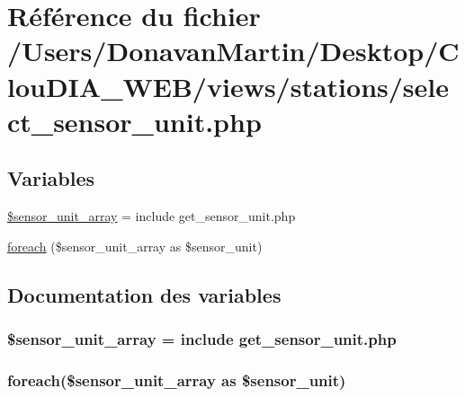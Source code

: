 \hypertarget{select__sensor__unit_8php}{}\section{Référence du fichier /\+Users/\+Donavan\+Martin/\+Desktop/\+Clou\+D\+I\+A\+\_\+\+W\+E\+B/views/stations/select\+\_\+sensor\+\_\+unit.php}
\label{select__sensor__unit_8php}
\subsection*{Variables}
\begin{DoxyCompactItemize}
\item 
\hyperlink{select__sensor__unit_8php_a8f41b989e454e33cf88090a128501a84}{\$sensor\+\_\+unit\+\_\+array} = include \textquotesingle{}get\+\_\+sensor\+\_\+unit.\+php\textquotesingle{}
\item 
\hyperlink{select__sensor__unit_8php_a1c1975000357477a6517a3e7dad478b0}{foreach} (\$sensor\+\_\+unit\+\_\+array as \$sensor\+\_\+unit)
\end{DoxyCompactItemize}


\subsection{Documentation des variables}
\hypertarget{select__sensor__unit_8php_a8f41b989e454e33cf88090a128501a84}{}
\subsubsection[{\$sensor\+\_\+unit\+\_\+array}]{\setlength{\rightskip}{0pt plus 5cm}\$sensor\+\_\+unit\+\_\+array = include \textquotesingle{}get\+\_\+sensor\+\_\+unit.\+php\textquotesingle{}}\label{select__sensor__unit_8php_a8f41b989e454e33cf88090a128501a84}
\hypertarget{select__sensor__unit_8php_a1c1975000357477a6517a3e7dad478b0}{}
\subsubsection[{foreach}]{\setlength{\rightskip}{0pt plus 5cm}foreach(\$sensor\+\_\+unit\+\_\+array as \$sensor\+\_\+unit)}\label{select__sensor__unit_8php_a1c1975000357477a6517a3e7dad478b0}
